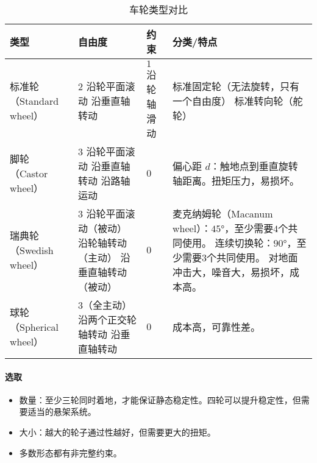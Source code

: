 \documentclass[
12pt, %
a4paper, 
oneside, %
headinclude,footinclude, %
]{scrartcl}
\begin{document}
\begin{table}[H]
\centering
\caption{车轮类型对比}
\begin{tabular}{|p{2cm}|p{4.2cm}|p{2.2cm}|p{7cm}|}
\hline
类型 & 自由度 & 约束 & 分类/特点 \\
\hline
标准轮 \newline （Standard wheel） & $ 2 $ \newline 沿轮平面滚动 \newline 沿垂直轴转动 & $ 1 $ \newline 沿轮轴滑动 & 标准固定轮（无法旋转，只有一个自由度） \newline 标准转向轮（舵轮） \\
\hline
脚轮 \newline （Castor wheel） & $ 3 $ \newline 沿轮平面滚动 \newline 沿垂直轴转动 \newline 沿路轴运动 & $ 0 $ & 偏心距 $ d $：触地点到垂直旋转轴距离。扭矩压力，易损坏。 \\
\hline
瑞典轮 \newline （Swedish wheel） & $ 3 $ \newline 沿轮平面滚动（被动） \newline 沿轮轴转动（主动） \newline 沿垂直轴转动（被动） & $ 0 $ & 麦克纳姆轮（Macanum wheel）：$ 45° $，至少需要$ 4 $个共同使用。 \newline 连续切换轮：$ 90° $，至少需要$ 3 $个共同使用。 \newline 对地面冲击大，噪音大，易损坏，成本高。 \\
\hline
球轮 \newline （Spherical wheel） & $ 3 $（全主动） \newline 沿两个正交轮轴转动 \newline 沿垂直轴转动 & $ 0 $ & 成本高，可靠性差。 \\
\hline
\end{tabular}
\end{table}
\paragraph{选取}
\begin{itemize}
\item 数量：至少三轮同时着地，才能保证静态稳定性。四轮可以提升稳定性，但需要适当的悬架系统。
\item 大小：越大的轮子通过性越好，但需要更大的扭矩。
\item 多数形态都有非完整约束。
\end{itemize}
\end{document}
